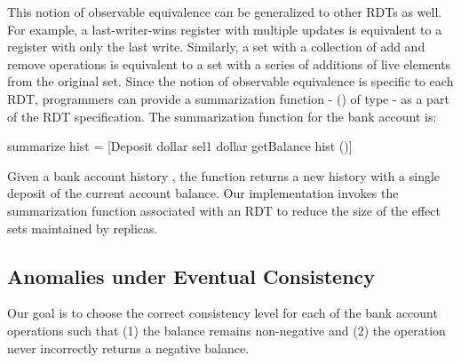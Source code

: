 This notion of observable equivalence can be generalized to other RDTs as well.
For example, a last-writer-wins register with multiple updates is equivalent to
a register with only the last write. Similarly, a set with a collection of add
and remove operations is equivalent to a set with a series of additions of live
elements from the original set. Since the notion of observable equivalence is
specific to each RDT, programmers can provide a summarization
function - () of type \cf{[e] -> [e]} -  as a part of
the RDT specification. The summarization function for the bank account is:

\begin{codehaskell}
 summarize hist =
   [Deposit dollar sel1 dollar getBalance hist ()]
\end{codehaskell}

\noindent Given a bank account history , the 
function returns a new history with a single deposit of the current
account balance. Our implementation invokes the summarization function
associated with an RDT to reduce the size of the effect sets
maintained by replicas.

\subsection{Anomalies under Eventual Consistency}

Our goal is to choose the correct consistency level for each of the bank
account operations such that (1) the balance remains non-negative and (2) the
 operation never incorrectly returns a negative balance.

